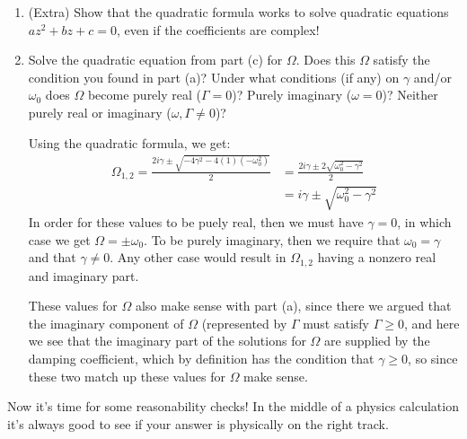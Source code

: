 \documentclass[10pt]{article}
\begin{document}
	 \begin{enumerate}[label=\alph*), resume]
	 	\item (Extra) Show that the quadratic formula works to solve quadratic equations $az^2 + bz + c = 0$,
			even if the coefficients are complex!
		\item Solve the quadratic equation from part (c) for $\Omega$. Does this $\Omega$ satisfy the condition
			you found in part (a)? Under what conditions (if any) on $\gamma$ and/or $\omega_0$ does 
			$\Omega$ become purely real ($\Gamma = 0$)? Purely imaginary ($\omega = 0$)? Neither purely 
			real or imaginary ($\omega, \Gamma \neq 0$)?

			\begin{solution}
				Using the quadratic formula, we get:
				\begin{align*}
					\Omega_{1, 2} = \frac{2 i \gamma \pm \sqrt{-4 \gamma^2 - 4(1)(-\omega_0^2)}}{2} &= 
					\frac{2 i \gamma \pm 2 \sqrt{\omega_0^2 - \gamma^2}}{2}\\
					&= i \gamma \pm \sqrt{\omega_0^2 - \gamma^2} 
				\end{align*}
				In order for these values to be puely real, then we must have $\gamma = 0$, in which case
				we get $\Omega = \pm \omega_0$. To be purely imaginary, then we require that $\omega_0 = \gamma$
				and that $\gamma \neq 0$. Any other case would result in $\Omega_{1, 2}$ having a nonzero real
				and imaginary part. 

				These values for $\Omega$ also make sense with part (a), since there we argued that the imaginary
				component of $\Omega$ (represented by $\Gamma$ must satisfy $\Gamma \ge 0$, and here we see 
				that the imaginary part of the solutions for $\Omega$ are supplied by the damping coefficient, 
				which by definition has the condition that $\gamma \ge 0$, so since these two match up these 
				values for $\Omega$ make sense. 
			\end{solution}
	 \end{enumerate}
	 Now it's time for some reasonability checks! In the middle of a physics calculation it's always good to see
	 if your answer is physically on the right track.
\end{document}
